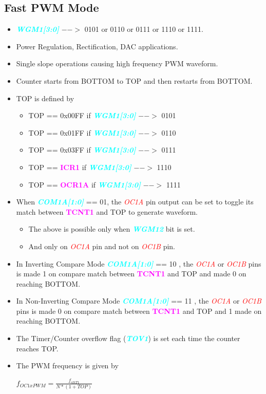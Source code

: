 \documentclass{article}
\newcommand{\bitFormat}[1]{\emph{\textbf{\textcolor{cyan}{#1}}}}
\newcommand{\regFormat}[1]{\textbf{\textcolor{magenta}{#1}}}
\newcommand{\pinFormat}[1]{\emph{\textcolor{red}{#1}}}
\begin{document}
\subsection{Fast PWM Mode}
\begin{itemize}
    \item \bitFormat{WGM1[3:0]} $-->$ 0101 or 0110 or 0111 or 1110 or 1111.
    \item Power Regulation, Rectification, DAC applications.
    \item Single slope operations causing high frequency PWM waveform.
    \item Counter starts from BOTTOM to TOP and then restarts from BOTTOM.
    \item TOP is defined by
    \begin{itemize}
        \item TOP == 0x00FF if \bitFormat{WGM1[3:0]} $-->$ 0101
        \item TOP == 0x01FF if \bitFormat{WGM1[3:0]} $-->$ 0110
        \item TOP == 0x03FF if \bitFormat{WGM1[3:0]} $-->$ 0111
        \item TOP ==   \regFormat{ICR1} if \bitFormat{WGM1[3:0]} $-->$ 1110
        \item TOP ==  \regFormat{OCR1A} if \bitFormat{WGM1[3:0]} $-->$ 1111
    \end{itemize}
    \item  When \bitFormat{COM1A[1:0]} == 01, the \pinFormat{OC1A} pin output can be set to toggle its match between \regFormat{TCNT1} and TOP to generate waveform.
    \begin{itemize}
        \item The above is possible only when \bitFormat{WGM12} bit is set.
        \item And only on \pinFormat{OC1A} pin and not on \pinFormat{OC1B} pin.
    \end{itemize}
    \item In Inverting Compare Mode \bitFormat{COM1A[1:0]} == 10 , the \pinFormat{OC1A} or \pinFormat{OC1B} pins is made 1 on compare match between \regFormat{TCNT1} and TOP and made 0 on reaching BOTTOM.
    \item In Non-Inverting Compare Mode \bitFormat{COM1A[1:0]} == 11 , the \pinFormat{OC1A} or \pinFormat{OC1B} pins is made 0 on compare match between \regFormat{TCNT1} and TOP and 1 made  on reaching BOTTOM.
    \item The Timer/Counter overflow flag (\bitFormat{TOV1}) is set each time the counter reaches TOP.
    \item The PWM frequency is given by 
    \begin{center}
        { \Large $f_{OC1xPWM} = \frac{f_{clkT1}}{N * (1+ TOP)}$ }
    \end{center}
\end{itemize}
\end{document}
